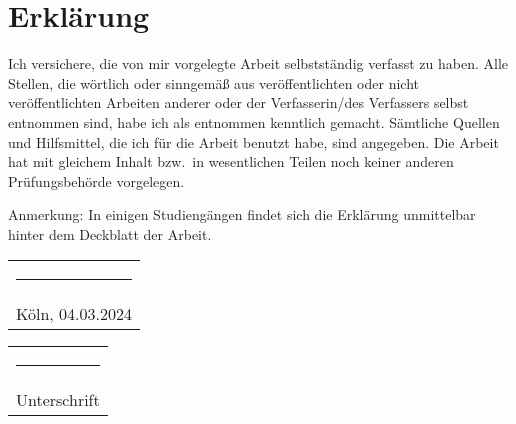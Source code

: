 \chapter*{Erklärung}
%
Ich versichere, die von mir vorgelegte Arbeit selbstständig verfasst zu haben. Alle Stellen, die wörtlich oder sinngemäß aus veröffentlichten oder nicht veröffentlichten Arbeiten anderer oder der Verfasserin/des Verfassers selbst entnommen sind, habe ich als entnommen kenntlich gemacht. Sämtliche Quellen und Hilfsmittel, die ich für die Arbeit benutzt habe, sind angegeben. Die Arbeit hat mit gleichem Inhalt bzw.\ in wesentlichen Teilen noch keiner anderen Prüfungsbehörde vorgelegen.
\par
Anmerkung: In einigen Studiengängen findet sich die Erklärung unmittelbar hinter dem Deckblatt der Arbeit.
\\[3cm]
%
\begin{tabular}{@{}l@{}}%
\rule{0.35\textwidth}{0.4pt}\\
Köln, 04.03.2024%
\end{tabular}%
\hfill%
\begin{tabular}{@{}l@{}}%
\rule{0.45\textwidth}{0.4pt}\\
Unterschrift%
\end{tabular}%